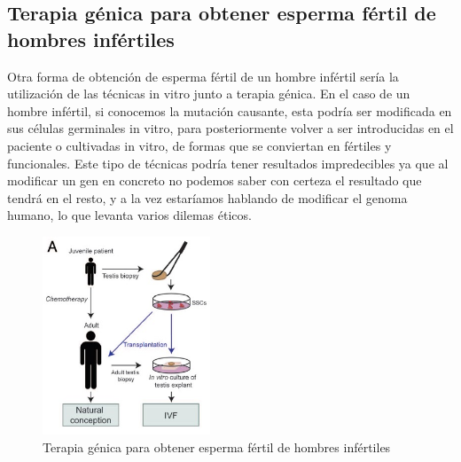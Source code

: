 \documentclass[a4paper,11pt]{article}
\begin{document}
\subsection{Terapia génica para obtener esperma fértil de hombres infértiles}
Otra forma de obtención de esperma fértil de un hombre infértil sería la utilización de las técnicas in vitro junto a terapia génica. En el caso de un hombre infértil, si conocemos la mutación causante, esta podría ser modificada en sus células germinales in vitro, para posteriormente volver a ser introducidas en el paciente o cultivadas in vitro, de formas que se conviertan en fértiles y funcionales. 
Este tipo de técnicas podría tener resultados impredecibles ya que al modificar un gen en concreto no podemos saber con certeza el resultado que tendrá en el resto, y a la vez estaríamos hablando de modificar el genoma humano, lo que levanta varios dilemas éticos. 
\begin{figure}[htb!] 
    \caption{Terapia génica para obtener esperma fértil de hombres infértiles}
    \centering 
    \includegraphics[width=5cm]{cancer-prepuber.jpg}
\end{figure}
\end{document}
